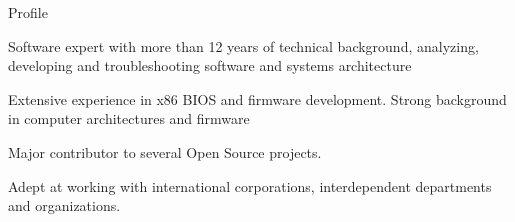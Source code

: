 \documentclass{resume} %
\begin{document}

\begin{rSection}{Profile}

\item Software expert with more than 12 years of technical background, analyzing, developing and troubleshooting software and systems architecture
\item Extensive experience in x86 BIOS and firmware development. Strong background in computer architectures and firmware
\item Major contributor to several Open Source projects.
\item Adept at working with international corporations, interdependent departments and organizations.

\end{rSection}


\end{document}
